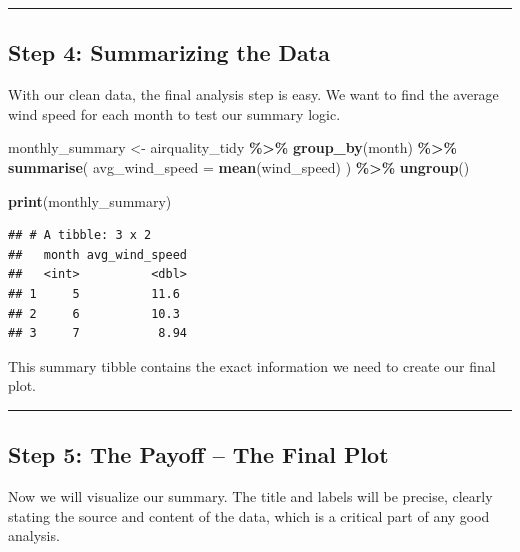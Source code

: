 \documentclass[
  11pt,
]{article}
\newenvironment{Shaded}{\begin{snugshade}}{\end{snugshade}}
\newcommand{\AttributeTok}[1]{\textcolor[rgb]{0.13,0.29,0.53}{#1}}
\newcommand{\FunctionTok}[1]{\textcolor[rgb]{0.13,0.29,0.53}{\textbf{#1}}}
\newcommand{\NormalTok}[1]{#1}
\newcommand{\OtherTok}[1]{\textcolor[rgb]{0.56,0.35,0.01}{#1}}
\newcommand{\SpecialCharTok}[1]{\textcolor[rgb]{0.81,0.36,0.00}{\textbf{#1}}}
\begin{document}
\begin{center}\rule{0.5\linewidth}{0.5pt}\end{center}

\subsection{Step 4: Summarizing the
Data}\label{step-4-summarizing-the-data}

With our clean data, the final analysis step is easy. We want to find
the average wind speed for each month to test our summary logic.

\begin{Shaded}
\begin{Highlighting}[]
\NormalTok{monthly\_summary }\OtherTok{\textless{}{-}}\NormalTok{ airquality\_tidy }\SpecialCharTok{\%\textgreater{}\%}
  \FunctionTok{group\_by}\NormalTok{(month) }\SpecialCharTok{\%\textgreater{}\%}
  \FunctionTok{summarise}\NormalTok{(}
    \AttributeTok{avg\_wind\_speed =} \FunctionTok{mean}\NormalTok{(wind\_speed)}
\NormalTok{  ) }\SpecialCharTok{\%\textgreater{}\%}
  \FunctionTok{ungroup}\NormalTok{()}

\FunctionTok{print}\NormalTok{(monthly\_summary)}
\end{Highlighting}
\end{Shaded}

\begin{verbatim}
## # A tibble: 3 x 2
##   month avg_wind_speed
##   <int>          <dbl>
## 1     5          11.6 
## 2     6          10.3 
## 3     7           8.94
\end{verbatim}

This summary tibble contains the exact information we need to create our
final plot.

\begin{center}\rule{0.5\linewidth}{0.5pt}\end{center}

\subsection{Step 5: The Payoff -- The Final
Plot}\label{step-5-the-payoff-the-final-plot}

Now we will visualize our summary. The title and labels will be precise,
clearly stating the source and content of the data, which is a critical
part of any good analysis.
\end{document}
